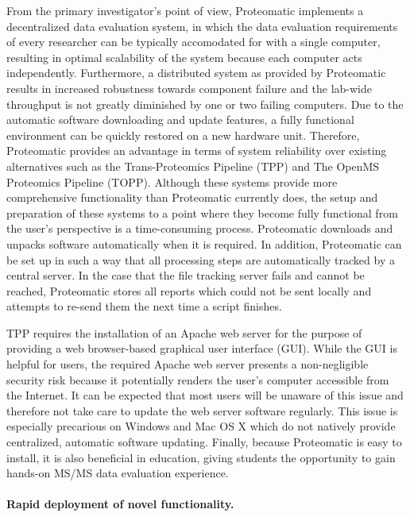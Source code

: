 From the primary investigator's point of view, Proteomatic implements a 
decentralized data evaluation system, in which the data evaluation requirements
of every researcher can be typically accomodated for with a single computer,
resulting in optimal scalability of the system because each computer acts 
independently.
Furthermore, a distributed system as provided by Proteomatic results in 
increased robustness towards component failure and the lab-wide throughput
is not greatly diminished by one or two failing computers.
Due to the automatic software downloading and update features, a fully 
functional environment can be quickly restored on a new hardware unit.
Therefore, Proteomatic provides an advantage in terms of system reliability 
over existing alternatives such as the Trans-Proteomics Pipeline (TPP) and 
The OpenMS Proteomics Pipeline (TOPP).
Although these systems provide more comprehensive functionality than Proteomatic
currently does, the setup and preparation of these systems to a point where
they become fully functional from the user's perspective is a time-consuming 
process.
Proteomatic downloads and unpacks software automatically when it is required.
In addition, Proteomatic can be set up in such a way that all processing steps
are automatically tracked by a central server.
In the case that the file tracking server fails and cannot be reached, 
Proteomatic stores all reports which could not be sent locally and attempts
to re-send them the next time a script finishes.

TPP requires the installation of an Apache web server for the purpose
of providing a web browser-based graphical user interface (GUI).
While the GUI is helpful for users, the required Apache web server presents a 
non-negligible security risk because it potentially renders the user's computer 
accessible from the Internet.
It can be expected that most users will be unaware of this issue and therefore
not take care to update the web server software regularly.
This issue is especially precarious on Windows and Mac OS X which do not 
natively provide centralized, automatic software updating.
Finally, because Proteomatic is easy to install, it is also beneficial in 
education, giving students the opportunity to gain hands-on MS/MS data 
evaluation experience.

\paragraph{Rapid deployment of novel functionality.}


